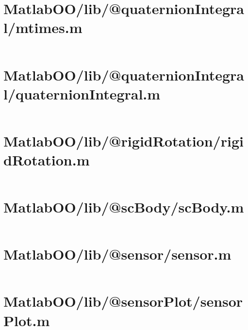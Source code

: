 \pagebreak
\section{MatlabOO/lib/@quaternionIntegral/mtimes.m}\label{code:MatlabOO/lib/@quaternionIntegral/mtimes.m}
\inputminted[linenos,fontsize=\scriptsize]{matlab}{/home/dcouture/git/mathyourlife/TSatPy/beta_versions/matlab_object_oriented/lib/@quaternionIntegral/mtimes.m}

\pagebreak
\section{MatlabOO/lib/@quaternionIntegral/quaternionIntegral.m}\label{code:MatlabOO/lib/@quaternionIntegral/quaternionIntegral.m}
\inputminted[linenos,fontsize=\scriptsize]{matlab}{/home/dcouture/git/mathyourlife/TSatPy/beta_versions/matlab_object_oriented/lib/@quaternionIntegral/quaternionIntegral.m}

\pagebreak
\section{MatlabOO/lib/@rigidRotation/rigidRotation.m}\label{code:MatlabOO/lib/@rigidRotation/rigidRotation.m}
\inputminted[linenos,fontsize=\scriptsize]{matlab}{/home/dcouture/git/mathyourlife/TSatPy/beta_versions/matlab_object_oriented/lib/@rigidRotation/rigidRotation.m}

\pagebreak
\section{MatlabOO/lib/@scBody/scBody.m}\label{code:MatlabOO/lib/@scBody/scBody.m}
\inputminted[linenos,fontsize=\scriptsize]{matlab}{/home/dcouture/git/mathyourlife/TSatPy/beta_versions/matlab_object_oriented/lib/@scBody/scBody.m}

\pagebreak
\section{MatlabOO/lib/@sensor/sensor.m}\label{code:MatlabOO/lib/@sensor/sensor.m}
\inputminted[linenos,fontsize=\scriptsize]{matlab}{/home/dcouture/git/mathyourlife/TSatPy/beta_versions/matlab_object_oriented/lib/@sensor/sensor.m}

\pagebreak
\section{MatlabOO/lib/@sensorPlot/sensorPlot.m}\label{code:MatlabOO/lib/@sensorPlot/sensorPlot.m}
\inputminted[linenos,fontsize=\scriptsize]{matlab}{/home/dcouture/git/mathyourlife/TSatPy/beta_versions/matlab_object_oriented/lib/@sensorPlot/sensorPlot.m}

